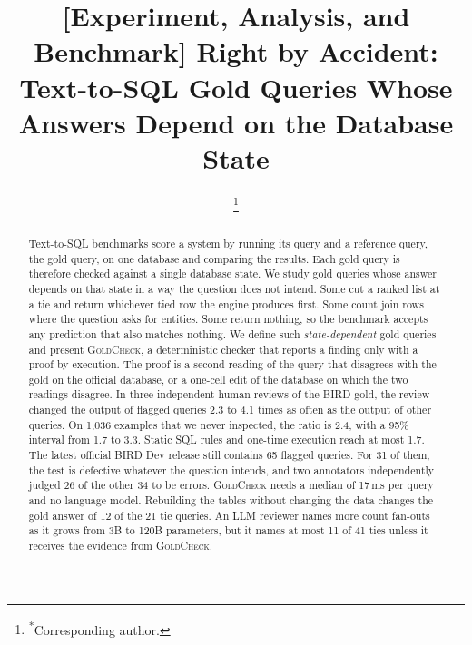\documentclass[conference]{IEEEtran}
\newcommand{\sys}{\textsc{GoldCheck}}
\begin{document}
\title{[Experiment, Analysis, and Benchmark] Right by Accident: Text-to-SQL Gold Queries Whose Answers Depend on the Database State}

\author{%
\thanks{\textsuperscript{*}Corresponding author.}
}

\maketitle

\begin{abstract}
Text-to-SQL benchmarks score a system by running its query and a reference
query, the gold query, on one database and comparing the results. Each gold
query is therefore checked against a single database state. We study gold
queries whose answer depends on that state in a way the question does not
intend. Some cut a ranked list at a tie and return whichever tied row the engine
produces first. Some count join rows where the question asks for entities. Some
return nothing, so the benchmark accepts any prediction that also matches
nothing. We define such \emph{state-dependent} gold queries and present \sys{},
a deterministic checker that reports a finding only with a proof by execution.
The proof is a second reading of the query that disagrees with the gold on the
official database, or a one-cell edit of the database on which the two readings
disagree. In three independent human reviews of the BIRD gold, the review
changed the output of flagged queries 2.3 to 4.1 times as often as the output of
other queries. On 1,036 examples that we never inspected, the ratio is 2.4, with
a 95\% interval from 1.7 to 3.3. Static SQL rules and one-time execution reach
at most 1.7. The latest official BIRD Dev release still contains 65 flagged
queries. For 31 of them, the test is defective whatever the question intends,
and two annotators independently judged 26 of the other 34 to be errors. \sys{}
needs a median of 17\,ms per query and no language model. Rebuilding the tables
without changing the data changes the gold answer of 12 of the 21 tie queries.
An LLM reviewer names more count fan-outs as it grows from 3B to 120B
parameters, but it names at most 11 of 41 ties unless it receives the evidence
from \sys{}.
\end{abstract}
\end{document}
